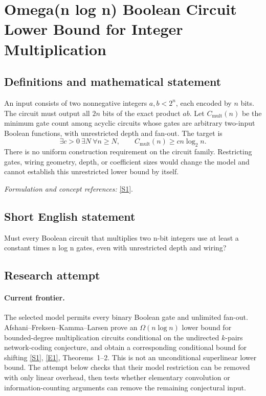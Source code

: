 \documentclass[11pt,a4paper]{article}
\newcommand{\sref}[2]{\hyperlink{source:#1:#2}{[S#2]}}
\newcommand{\eref}[2]{\hyperlink{extra:#1:#2}{[E#2]}}
\newif\ifshowcatalogue
\newcommand{\cataloguescope}[1]{\ifshowcatalogue
 \paragraph{Exact scope in the supplied catalogue.}
 \begin{quote}\small #1\end{quote}\fi}
\numberwithin{equation}{section}
\begin{document}
\setcounter{section}{0}
\clearpage
\section*{\texorpdfstring{Omega(n log n) Boolean Circuit Lower Bound for Integer Multiplication}{Omega(n log n) Boolean Circuit Lower Bound for Integer Multiplication}}\label{30006781}
\subsection{Definitions and mathematical statement}
An input consists of two nonnegative integers $a,b<2^n$, each encoded by $n$ bits. The circuit must output all $2n$ bits of the exact product $ab$. Let $C_{\mathrm{mult}}(n)$ be the minimum gate count among acyclic circuits whose gates are arbitrary two-input Boolean functions, with unrestricted depth and fan-out. The target is
\[
 \exists c>0\ \exists N\ \forall n\ge N,
 \qquad C_{\mathrm{mult}}(n)\ge c n\log_2n.
\]
There is no uniform construction requirement on the circuit family. Restricting gates, wiring geometry, depth, or coefficient sizes would change the model and cannot establish this unrestricted lower bound by itself.
\par\smallskip\textit{Formulation and concept references:} \sref{30006781}{1}.
\cataloguescope{Let C\_mult(n) be the least gate count of an acyclic Boolean circuit with 2n input bits, all 2n output bits of the product of the two nonnegative n-bit inputs, arbitrary binary Boolean gates, unrestricted fan-out and depth, and no uniformity requirement. There exist constants c>0 and N such that C\_mult(n)>=c*n*log2(n) for every n>=N.}
\subsection{Short English statement}
Must every Boolean circuit that multiplies two n-bit integers use at least a constant times n log n gates, even with unrestricted depth and wiring?
\subsection{Research attempt}

\paragraph{Current frontier.}
The selected model permits every binary Boolean gate and unlimited fan-out. Afshani--Freksen--Kamma--Larsen prove an $\Omega(n\log n)$ lower bound for bounded-degree multiplication circuits conditional on the undirected $k$-pairs network-coding conjecture, and obtain a corresponding conditional bound for shifting \sref{30006781}{1}, \eref{30006781}{1}, Theorems~1--2. This is not an unconditional superlinear lower bound. The attempt below checks that their model restriction can be removed with only linear overhead, then tests whether elementary convolution or information-counting arguments can remove the remaining conjectural input.
\end{document}
